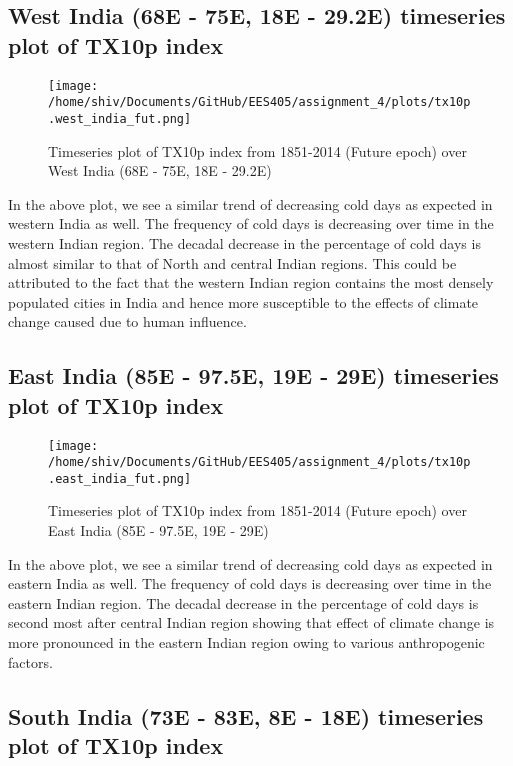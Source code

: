 \documentclass[a4paper, 12pt, twoside]{report}
\begin{document}
\subsection{West India (68E - 75E, 18E - 29.2E) timeseries plot of TX10p index}

\begin{figure}[h]
    \centering
    \texttt{[image: /home/shiv/Documents/GitHub/EES405/assignment\_4/plots/tx10p.west\_india\_fut.png]}
    \caption{\centering Timeseries plot of TX10p index from 1851-2014 (Future epoch) over West India (68E - 75E, 18E - 29.2E)}
    \label{fig:TX10p_timeseries_west_india_fut}
\end{figure}

In the above plot, we see a similar trend of decreasing cold days as expected in western India as well. The frequency of cold days is decreasing over time in the western Indian region. The decadal decrease in the percentage of cold days is almost similar to that of North and central Indian regions. This could be attributed to the fact that the western Indian region contains the most densely populated cities in India and hence more susceptible to the effects of climate change caused due to human influence.
\newpage
\subsection{East India (85E - 97.5E, 19E - 29E) timeseries plot of TX10p index}

\begin{figure}[h]
    \centering
    \texttt{[image: /home/shiv/Documents/GitHub/EES405/assignment\_4/plots/tx10p.east\_india\_fut.png]}
    \caption{\centering Timeseries plot of TX10p index from 1851-2014 (Future epoch) over East India (85E - 97.5E, 19E - 29E)}
    \label{fig:TX10p_timeseries_east_india_fut}
\end{figure}

In the above plot, we see a similar trend of decreasing cold days as expected in eastern India as well. The frequency of cold days is decreasing over time in the eastern Indian region. The decadal decrease in the percentage of cold days is second most after central Indian region showing that effect of climate change is more pronounced in the eastern Indian region owing to various anthropogenic factors.

\newpage

\subsection{South India (73E - 83E, 8E - 18E) timeseries plot of TX10p index}
\end{document}
